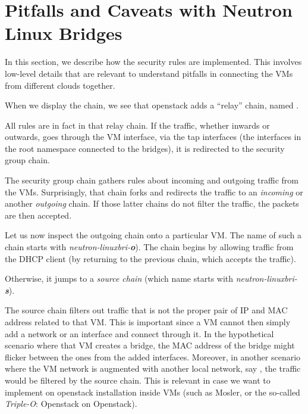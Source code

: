\section{Pitfalls and Caveats with Neutron Linux Bridges}
\label{appendix:secgroups}


In this section, we describe how the security rules are
implemented. This involves low-level details that are relevant to
understand pitfalls in connecting the VMs from different clouds
together.

When we display the  chain, we see that openstack adds a
``relay'' chain, named .


All rules are in fact in that relay chain. If the traffic, whether
inwards or outwards, goes through the VM interface, via the tap
interfaces (\ie the interfaces in the root namespace connected to the
bridges), it is redirected to the security group chain.


The security group chain gathers rules about incoming and outgoing
traffic from the VMs. Surprisingly, that chain forks and redirects the
traffic to an \emph{incoming} or another \emph{outgoing} chain. If
those latter chains do not filter the traffic, the packets are then
accepted.


Let us now inspect the outgoing chain onto a particular VM. The name
of such a chain starts with \emph{neutron-linuxbri-\textbf{o}}). The
chain begins by allowing traffic from the DHCP client (by returning to
the previous chain, which accepts the traffic).


Otherwise, it jumps to a \emph{source chain} (which name starts with
\emph{neutron-linuxbri-\textbf{s}}).


The source chain filters out traffic that is not the proper pair of IP
and MAC address related to that VM. This is important since a VM
cannot then simply add a network or an interface and connect through
it. In the hypothetical scenario where that VM creates a bridge, the
MAC address of the bridge might flicker between the ones from the
added interfaces. Moreover, in another scenario where the VM network
is augmented with another local network, say , the
traffic would be filtered by the source chain. This is relevant in
case we want to implement on openstack installation inside VMs (such
as Mosler, or the so-called \emph{Triple-O}: Openstack on Openstack).

